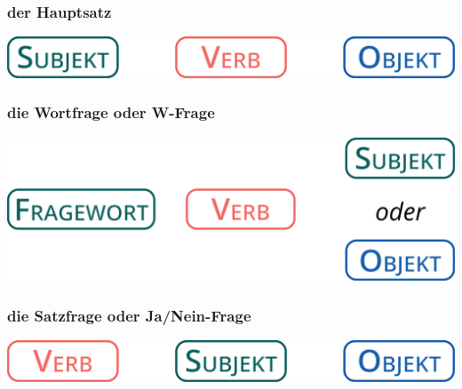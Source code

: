             \begin{multicols}{3}
                \raggedcolumns
                \subsubsection{der Hauptsatz}
    
    
                    \includegraphics[width=.9\linewidth]{figures/dieHauptsatz.eps}
                    \label{fig:languages:deutsch:dieHauptsatz}
    
                \columnbreak
                \subsubsection{die Wortfrage oder W-Frage}
    
    
                    \includegraphics[width=.9\linewidth]{figures/dieWortfrage.eps}
                    \label{fig:languages:deutsch:dieWortfrage}
                \columnbreak
                \subsubsection{die Satzfrage oder Ja/Nein-Frage}
    
    
                    \includegraphics[width=.9\linewidth]{figures/dieSatzfrage.eps}
                    \label{fig:languages:deutsch:dieSatzfrage}
    
            \end{multicols}

